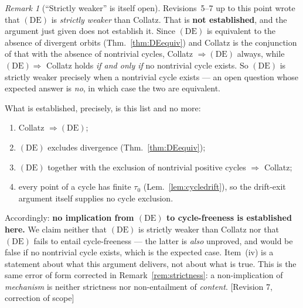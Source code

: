 \documentclass[11pt]{article}
\theoremstyle{plain}
\theoremstyle{definition}
\theoremstyle{remark}
\newtheorem{remark}[theorem]{Remark}
\newcommand{\status}[1]{\textsf{\footnotesize[#1]}}
\begin{document}
\begin{remark}[``Strictly weaker'' is itself open]\label{rem:strictlyweaker}
Revisions~5--7 up to this point wrote that $(\mathrm{DE})$ is \emph{strictly weaker} than Collatz.
That is \textbf{not established}, and the argument just given does not establish it. Since
$(\mathrm{DE})$ is equivalent to the absence of divergent orbits (Thm.~\ref{thm:DEequiv}) and
Collatz is the conjunction of that with the absence of nontrivial cycles, Collatz
$\Rightarrow(\mathrm{DE})$ always, while $(\mathrm{DE})\Rightarrow$ Collatz holds \emph{if and only
if} no nontrivial cycle exists. So $(\mathrm{DE})$ is strictly weaker precisely when a nontrivial
cycle exists --- an open question whose expected answer is \emph{no}, in which case the two are
equivalent.

What is established, precisely, is this list and no more:

\begin{enumerate}[label=(\roman*),leftmargin=2em]
\item Collatz $\Rightarrow(\mathrm{DE})$;
\item $(\mathrm{DE})$ excludes divergence (Thm.~\ref{thm:DEequiv});
\item $(\mathrm{DE})$ together with the exclusion of nontrivial positive cycles $\Rightarrow$
  Collatz;
\item every point of a cycle has finite $\tau_0$ (Lem.~\ref{lem:cycledrift}), so the drift-exit
  argument itself supplies no cycle exclusion.
\end{enumerate}

Accordingly: \textbf{no implication from $(\mathrm{DE})$ to cycle-freeness is established here.}
We claim neither that $(\mathrm{DE})$ is strictly weaker than Collatz nor that $(\mathrm{DE})$
fails to entail cycle-freeness --- the latter is \emph{also} unproved, and would be false if no
nontrivial cycle exists, which is the expected case. Item~(iv) is a statement about what this
argument delivers, not about what is true. This is the same error of form corrected in
Remark~\ref{rem:strictness}: a non-implication of \emph{mechanism} is neither strictness nor
non-entailment of \emph{content}.
\status{Revision 7, correction of scope}
\end{remark}
\end{document}
